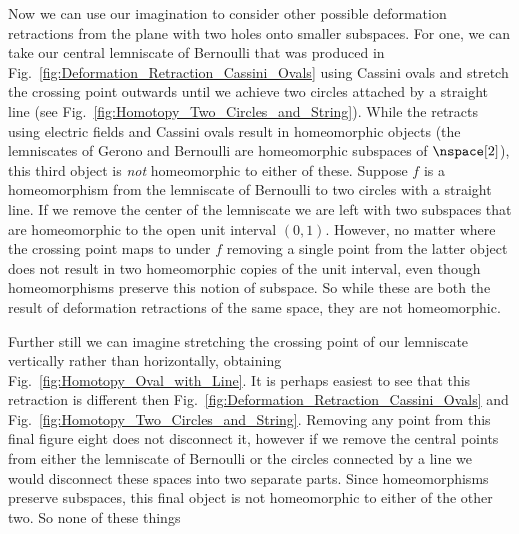 \documentclass{book}                                                           %
\begin{document}
                Now we can use our imagination to consider other possible
                deformation retractions from the plane with two holes onto
                smaller subspaces. For one, we can take our central lemniscate
                of Bernoulli that was produced in
                Fig.~\ref{fig:Deformation_Retraction_Cassini_Ovals} using
                Cassini ovals and stretch the crossing point outwards until we
                achieve two circles attached by a straight line
                (see Fig.~\ref{fig:Homotopy_Two_Circles_and_String}). While the
                retracts using electric fields and Cassini ovals result in
                homeomorphic objects (the lemniscates of Gerono and  Bernoulli
                are homeomorphic subspaces of $\nspace[2]$), this third object
                is \textit{not} homeomorphic to either of these. Suppose $f$ is
                a homeomorphism from the lemniscate of Bernoulli to two circles
                with a straight line. If we remove the center of the lemniscate
                we are left with two subspaces that are homeomorphic to the open
                unit interval $(0,1)$. However, no matter where the crossing
                point maps to under $f$ removing a single point from the latter
                object does not result in two homeomorphic copies of the unit
                interval, even though homeomorphisms preserve this notion of
                subspace. So while these are both the result of deformation
                retractions of the same space, they are not homeomorphic.
                \par\hfill\par
                Further still we can imagine stretching the crossing point of
                our lemniscate vertically rather than horizontally, obtaining
                Fig.~\ref{fig:Homotopy_Oval_with_Line}. It is perhaps easiest to
                see that this retraction is different then
                Fig.~\ref{fig:Deformation_Retraction_Cassini_Ovals} and
                Fig.~\ref{fig:Homotopy_Two_Circles_and_String}. Removing
                any point from this final figure eight does not disconnect it,
                however if we remove the central points from either the
                lemniscate of Bernoulli or the circles connected by a line we
                would disconnect these spaces into two separate parts. Since
                homeomorphisms preserve subspaces, this final object is not
                homeomorphic to either of the other two. So none of these things
\end{document}

